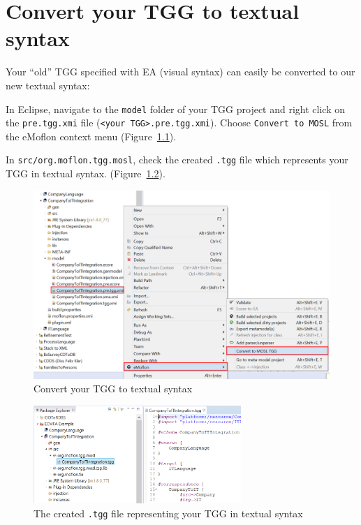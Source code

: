 \newpage

\chapter{Convert your TGG to textual syntax}
\genHeader

Your ``old'' TGG specified with EA (visual syntax) can easily be
converted to our new textual syntax:

\begin{stepbystep}

\item In Eclipse, navigate to the \texttt{model} folder
of your TGG project and right click on the \texttt{pre.tgg.xmi} file
(\texttt{<your TGG>.pre.tgg.xmi}).
Choose \texttt{Convert to MOSL} from the eMoflon context menu
(Figure~\ref{fig:convertToMOSL}).


\item In \texttt{src/org.moflon.tgg.mosl}, check the
created \texttt{.tgg} file which represents your TGG in textual syntax.
(Figure~\ref{fig:tggfile}).
\end{stepbystep}

\begin{figure}[h]
\begin{center}
 	\includegraphics[width=\textwidth]{../../org.moflon.doc.handbook.05_miscellaneous/10_convertTGGToMOSLTGG/convertToMOSL}
	\caption{Convert your TGG to textual syntax}
  	\label{fig:convertToMOSL}
\end{center}

\end{figure}
\begin{figure}[h]
\begin{center}
 	\includegraphics[width=0.7\textwidth]{../../org.moflon.doc.handbook.05_miscellaneous/10_convertTGGToMOSLTGG/tggfile}
	\caption{The created \texttt{.tgg} file representing your TGG in textual
	syntax}
  	\label{fig:tggfile}
\end{center}
\end{figure}
